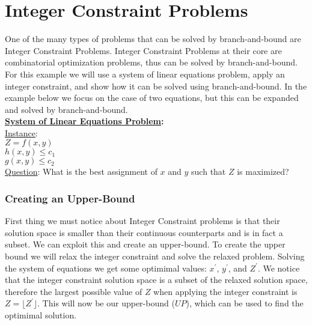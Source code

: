 \section{Integer Constraint Problems}
    One of the many types of problems that can be solved by 
    branch-and-bound are Integer Constraint Problems. 
    Integer Constraint Problems at their core are combinatorial 
    optimization problems, thus can be solved by branch-and-bound.
    For this example we will use a system of linear equations problem,
    apply an integer constraint, and show how it can be solved using 
    branch-and-bound. In the example below we focus on the case of 
    two equations, but this can be expanded and solved by branch-and-bound.
    \\ 
    \noindent
	\textbf{\underline{System of Linear Equations Problem}:}\\
	\underline{Instance}: \\ $Z = f(x,y)$  \\ $h(x,y) \leq c_1$ \\ $g(x,y) \leq c_2 $ \\
	\underline{Question}: What is the best assignment of $x$ and $y$ such that $Z$ is maximized?
    \\

        \subsubsection{Creating an Upper-Bound}
        First thing we must notice about Integer Constraint problems is that
        their solution space is smaller than their continuous counterparts and 
        is in fact a subset.
        We can exploit this and create an upper-bound. To create the upper bound
        we will relax the integer constraint and solve the relaxed problem.
        Solving the system of equations we get some optimimal values: $x^{'}$, $y^{'}$, 
        and $Z^{'}$. We notice that the integer constraint solution
        space is a subset of the relaxed solution space, therefore the largest
        possible value of $Z$ when applying the integer constraint is 
        $ Z = \lfloor Z^{'} \rfloor$. This will now be our upper-bound ($UP$), which can be used
        to find the optimimal solution.

